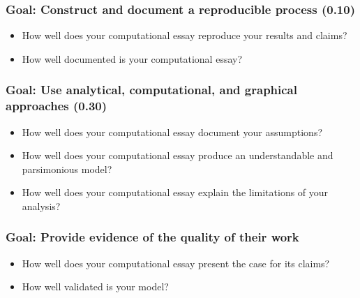 \documentclass[letterpaper,10pt,english]{jupyterBook}
\begin{document}
\subsubsection{Goal: Construct and document a reproducible process (0.10)}
\label{\detokenize{content/0_course/4_rubric:goal-construct-and-document-a-reproducible-process-0-10}}\begin{itemize}
\item {} 
\sphinxAtStartPar
How well does your computational essay reproduce your results and claims?

\item {} 
\sphinxAtStartPar
How  well documented is your computational essay?

\end{itemize}


\subsubsection{Goal: Use analytical, computational, and graphical approaches (0.30)}
\label{\detokenize{content/0_course/4_rubric:goal-use-analytical-computational-and-graphical-approaches-0-30}}\begin{itemize}
\item {} 
\sphinxAtStartPar
How well does your computational essay document your assumptions?

\item {} 
\sphinxAtStartPar
How well does your computational essay produce an understandable and parsimonious model?

\item {} 
\sphinxAtStartPar
How well does your computational essay explain the limitations of your analysis?

\end{itemize}


\subsubsection{Goal: Provide evidence of the quality of their work}
\label{\detokenize{content/0_course/4_rubric:goal-provide-evidence-of-the-quality-of-their-work}}\begin{itemize}
\item {} 
\sphinxAtStartPar
How well does your computational essay present  the case for its claims?

\item {} 
\sphinxAtStartPar
How well validated  is your model?

\end{itemize}
\end{document}
